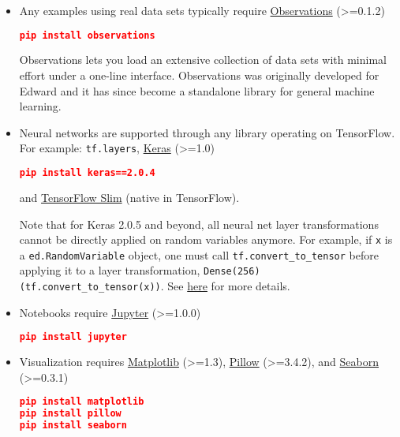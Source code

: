 \begin{itemize}
  \item Any examples using real data sets typically require
  \href{https://github.com/edwardlib/observations/}{Observations} (>=0.1.2)
\begin{lstlisting}[language=JSON]
pip install observations
\end{lstlisting}
Observations lets you load an extensive collection of data sets with
minimal effort under a one-line interface. Observations was originally
developed for Edward and it has since become a standalone library for
general machine learning.
  \item Neural networks are supported through any library operating
    on TensorFlow. For example:
  \texttt{tf.layers},
  \href{http://keras.io}{Keras} (>=1.0)
\begin{lstlisting}[language=JSON]
pip install keras==2.0.4
\end{lstlisting}
  and
  \href{https://github.com/tensorflow/tensorflow/tree/master/tensorflow/contrib/slim}{TensorFlow Slim}
  (native in TensorFlow).

Note that for Keras 2.0.5 and beyond, all neural net layer transformations cannot be directly applied on random variables anymore. For example, if \texttt{x} is a \texttt{ed.RandomVariable} object, one must call \texttt{tf.convert_to_tensor} before applying it to a layer transformation, \texttt{Dense(256)(tf.convert_to_tensor(x))}.
See \href{https://github.com/fchollet/keras/issues/6979}{here} for more details.
  \item Notebooks require
  \href{http://jupyter.org}{Jupyter} (>=1.0.0)
\begin{lstlisting}[language=JSON]
pip install jupyter
\end{lstlisting}
  \item Visualization requires
  \href{http://matplotlib.org}{Matplotlib} (>=1.3),
  \href{https://pillow.readthedocs.io}{Pillow} (>=3.4.2), and
  \href{https://seaborn.pydata.org}{Seaborn} (>=0.3.1)
\begin{lstlisting}[language=JSON]
pip install matplotlib
pip install pillow
pip install seaborn
\end{lstlisting}
\end{itemize}
